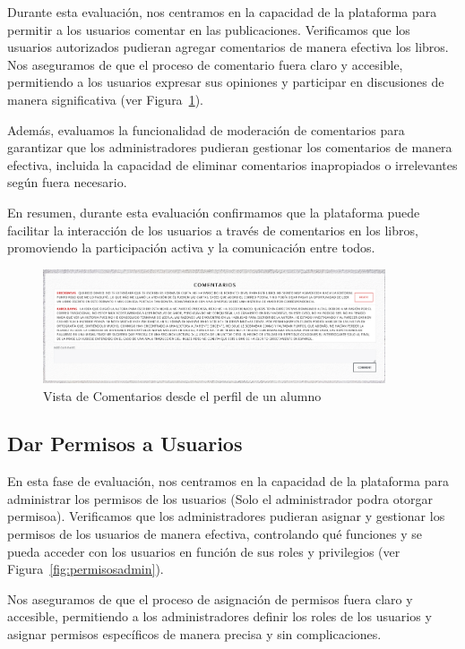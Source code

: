 \documentclass[a4paper, 12pt]{book}
\begin{document}
Durante esta evaluación, nos centramos en la capacidad de la plataforma para permitir a los usuarios comentar en las publicaciones. Verificamos que los usuarios 
autorizados pudieran agregar comentarios de manera efectiva los libros. Nos aseguramos de que el proceso de comentario fuera claro y accesible, permitiendo a los 
usuarios expresar sus opiniones y participar en discusiones de manera significativa (ver Figura~\ref{fig:comentarios}).

Además, evaluamos la funcionalidad de moderación de comentarios para garantizar que los administradores pudieran gestionar los comentarios de manera efectiva, 
incluida la capacidad de eliminar comentarios inapropiados o irrelevantes según fuera necesario.

En resumen, durante esta evaluación confirmamos que la plataforma puede facilitar la interacción de los usuarios a través de comentarios en los libros, 
promoviendo la participación activa y la comunicación entre todos.

\begin{figure}
  \centering
  \includegraphics[width=0.9\textwidth]{img/comentarios.png}
  \caption{Vista de Comentarios desde el perfil de un alumno}
  \label{fig:comentarios}
\end{figure}
\subsection{Dar Permisos a Usuarios}
\label{sec:grant-permissions-users}

En esta fase de evaluación, nos centramos en la capacidad de la plataforma para administrar los permisos de los usuarios (Solo el administrador podra otorgar permisoa). 
Verificamos que los administradores pudieran asignar y gestionar los permisos de los usuarios de manera efectiva, controlando qué funciones y se pueda 
acceder con los usuarios en función de sus roles y privilegios (ver Figura~\ref{fig:permisosadmin}).

Nos aseguramos de que el proceso de asignación de permisos fuera claro y accesible, permitiendo a los administradores definir los roles de los usuarios y asignar 
permisos específicos de manera precisa y sin complicaciones.
\end{document}
